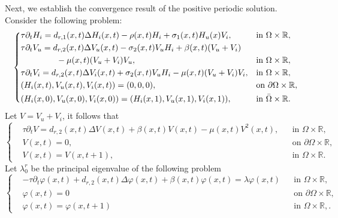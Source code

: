 \documentclass[11pt,reqno]{amsart}
\numberwithin{equation}{section}
\begin{document}
Next, we establish the convergence result of the positive periodic solution.
Consider the following problem:
\begin{equation}\label{4-11}
\left\{
\begin{aligned}
&\tau \partial_{t} H_{i}
= d_{r,1}(x,t)\Delta H_{i}(x,t) -\rho(x,t)H_{i}+\sigma_{1}(x,t)H_{u}(x)V_{i}, &&\text{in } \Omega\times\mathbb{R},\\
&\tau \partial_{t} V_{u}
= d_{r,2}(x,t)\Delta V_{u}(x,t)  -\sigma_{2}(x,t)V_{u}H_{i}+\beta(x,t)(V_{u}+V_{i}) \\
&\hspace{1.5cm}-\mu(x,t)(V_u+V_{i})V_{u},&&\text{in } \Omega\times\mathbb{R}, \\
&\tau \partial_{t} V_{i}
= d_{r,2}(x,t)\Delta V_{i}(x,t) + \sigma_{2}(x,t)V_{u}H_{i}-\mu(x,t)(V_{u}+V_{i})V_{i},&& \text{in } \Omega\times\mathbb{R},\\
& (H_{i}(x,t), V_{u}(x,t), V_{i}(x,t))=(0, 0, 0),&&\text{on } \partial\Omega\times\mathbb{R}, \\
&(H_{i}(x,0), V_{u}(x,0), V_{i}(x,0))=(H_{i}(x,1), V_{u}(x,1), V_{i}(x,1)),&&\text{in } \bar\Omega\times\mathbb{R}.
\end{aligned}
\right.
\end{equation}
Let $V=V_{u}+V_{i}$, it follows that
\begin{equation}\label{4-12}
\left\{
\begin{aligned}
&\tau\partial_{t} V = d_{r,2}(x,t)\Delta V(x,t) + \beta(x,t)V(x,t) - \mu(x,t) V^{2}(x,t), && \text{in } \Omega\times\mathbb{R},\\
&V(x,t) = 0, && \text{on } \partial\Omega\times\mathbb{R},\\
&V(x,t) = V(x,t+1), && \text{in } \Omega\times\mathbb{R}.
\end{aligned}
\right.
\end{equation}
Let $\lambda_{0}^{r}$ be the principal eigenvalue of the following problem
\begin{equation*}
\left\{
\begin{aligned}
& -\tau\partial_{t} \varphi(x,t) + d_{r,2}(x,t)\Delta \varphi(x,t) + \beta(x,t)\varphi(x,t) = \lambda \varphi(x,t) && \text{in } \Omega\times\mathbb{R},\\
&\varphi(x,t) = 0 && \text{on } \partial\Omega\times\mathbb{R},\\
&\varphi(x,t) = \varphi(x,t+1) && \text{in } \Omega\times\mathbb{R},.
\end{aligned}
\right.
\end{equation*}
\end{document}
